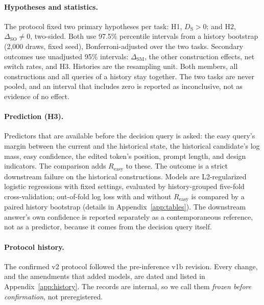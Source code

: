 \paragraph{Hypotheses and statistics.} The protocol fixed two primary hypotheses per task: H1,
$D_{\mathrm{S}} > 0$; and H2, $\Delta_{\mathrm{SO}} \neq 0$, two-sided. Both use 97.5\%
percentile intervals from a history bootstrap (2{,}000 draws, fixed seed), Bonferroni-adjusted over the
two tasks. Secondary outcomes use unadjusted 95\% intervals: $\Delta_{\mathrm{SM}}$, the other
construction effects, net switch rates, and H3. Histories are the resampling unit. Both members, all
constructions and all queries of a history stay together. The two tasks are never pooled, and an
interval that includes zero is reported as inconclusive, not as evidence of no effect.

\paragraph{Prediction (H3).} Predictors that are available before the decision query is asked: the easy
query's margin between the current and the historical state, the historical candidate's log mass, easy
confidence, the edited token's position, prompt length, and design indicators. The comparison adds
$R_{\mathrm{easy}}$ to these. The outcome is a strict downstream failure on the historical constructions.
Models are L2-regularized logistic regressions \citep[scikit-learn;][]{pedregosa2011sklearn} with fixed
settings, evaluated by history-grouped five-fold cross-validation; out-of-fold log loss with and without
$R_{\mathrm{easy}}$ is compared by a paired history bootstrap (details in Appendix~\ref{app:tables}). The downstream answer's own confidence is reported separately as a
contemporaneous reference, not as a predictor, because it comes from the decision query itself.

\paragraph{Protocol history.} The confirmed v2 protocol followed the pre-inference v1b revision.
Every change, and the amendments that added models, are dated and listed in
Appendix~\ref{app:history}. The records are internal, so we call them \emph{frozen before confirmation},
not preregistered.
